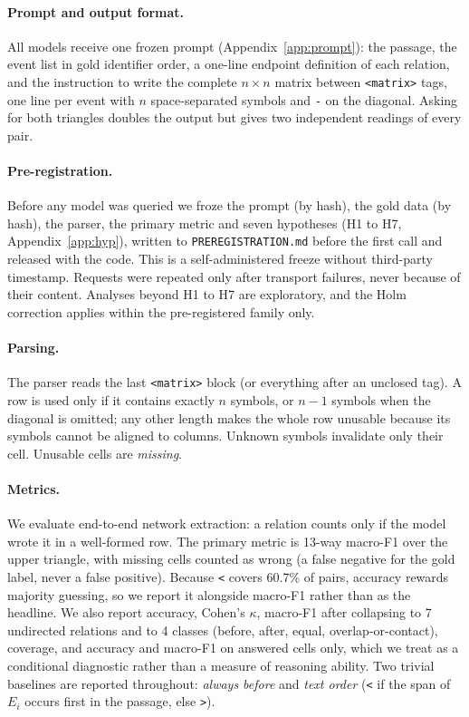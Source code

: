 \documentclass[11pt]{article}
\newcommand{\rel}[1]{\texttt{#1}}
\begin{document}
\paragraph{Prompt and output format.}
All models receive one frozen prompt (Appendix~\ref{app:prompt}): the passage, the event list in gold identifier order, a one-line endpoint definition of each relation, and the instruction to write the complete $n\times n$ matrix between \texttt{<matrix>} tags, one line per event with $n$ space-separated symbols and \texttt{-} on the diagonal. Asking for both triangles doubles the output but gives two independent readings of every pair.

\paragraph{Pre-registration.}
Before any model was queried we froze the prompt (by hash), the gold data (by hash), the parser, the primary metric and seven hypotheses (H1 to H7, Appendix~\ref{app:hyp}), written to \texttt{PREREGISTRATION.md} before the first call and released with the code. This is a self-administered freeze without third-party timestamp. Requests were repeated only after transport failures, never because of their content. Analyses beyond H1 to H7 are exploratory, and the Holm correction applies within the pre-registered family only.

\paragraph{Parsing.}
The parser reads the last \texttt{<matrix>} block (or everything after an unclosed tag). A row is used only if it contains exactly $n$ symbols, or $n-1$ symbols when the diagonal is omitted; any other length makes the whole row unusable because its symbols cannot be aligned to columns. Unknown symbols invalidate only their cell. Unusable cells are \emph{missing}.

\paragraph{Metrics.}
We evaluate end-to-end network extraction: a relation counts only if the model wrote it in a well-formed row. The primary metric is 13-way macro-F1 over the upper triangle, with missing cells counted as wrong (a false negative for the gold label, never a false positive). Because \rel{<} covers 60.7\% of pairs, accuracy rewards majority guessing, so we report it alongside macro-F1 rather than as the headline. We also report accuracy, Cohen's $\kappa$, macro-F1 after collapsing to 7 undirected relations and to 4 classes (before, after, equal, overlap-or-contact), coverage, and accuracy and macro-F1 on answered cells only, which we treat as a conditional diagnostic rather than a measure of reasoning ability. Two trivial baselines are reported throughout: \emph{always before} and \emph{text order} (\rel{<} if the span of $E_i$ occurs first in the passage, else \rel{>}).
\end{document}
